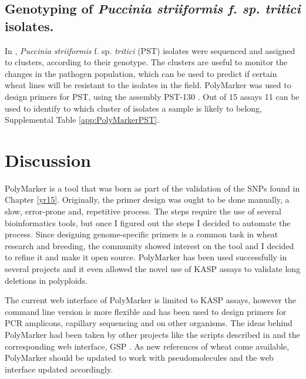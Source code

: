 \subsection{Genotyping of \textit{Puccinia 
striiformis f. sp. tritici} isolates.}
In \cite{Hubbard2015}, \textit{Puccinia striiformis} f. sp. \textit{tritici} (PST) isolates were sequenced and assigned to clusters, according to their genotype.
The clusters are useful to monitor the changes in the pathogen population, which can be used to predict if certain wheat lines will be resistant to the isolates in the field. 
PolyMarker was used to design primers for PST, using the assembly PST-130 \cite{Cantu2011}.
Out of 15 assays 11 can be used to identify to which cluster of isolates a sample is likely to belong, Supplemental Table \ref{app:PolyMarkerPST}.


\section{Discussion}

PolyMarker is a tool that was born as part of the validation of the SNPs found in Chapter \ref{yr15}. 
Originally, the primer design was ought to be done manually, a slow, error-prone and, repetitive process. 
The steps require the use of several bioinformatics tools, but once I figured out the steps I decided to automate the process. 
Since designing genome-specific primers is a common task in wheat research and breeding, the community showed interest on the tool and I decided to refine it and make it open source. 
PolyMarker has been used successfully in several projects and it even allowed the novel use of KASP assays to validate long deletions in polyploids. 

The current web interface of PolyMarker is limited to KASP assays, however the command line version is more flexible and has been used to design primers for PCR amplicons, capillary sequencing and on other organisms. 
The ideas behind PolyMarker had been taken by other projects like the scripts described in \cite{Ma2015} and the corresponding web interface, GSP \citep{Wang2016}. 
As new references of wheat come available, PolyMarker should be updated to work with pseudomolecules and the web interface updated accordingly.  


 


